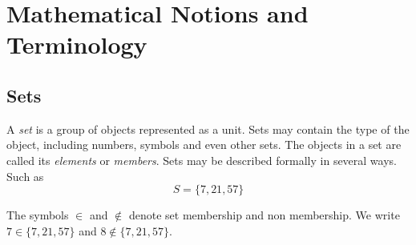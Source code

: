 \section{Mathematical Notions and Terminology}
\subsection{Sets}
\begin{definition}[Sets]
  A \textit{set} is a group of objects represented as a unit. Sets may contain the type of the object, including numbers, symbols and even other sets. The objects in a set are called its \textit{elements} or \textit{members}. Sets may be described formally in several ways. Such as
  $$S = \{7, 21, 57\}$$
\end{definition}

The symbols $\in$ and $\notin$ denote set membership and non membership. We write $7 \in \{7, 21, 57\}$ and $8 \notin \{7, 21, 57\}$.
